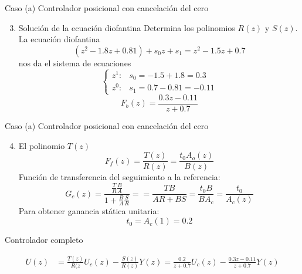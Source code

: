 \documentclass[presentation,aspectratio=169]{beamer}
\begin{document}
\begin{frame}[label={sec:orgd24d4be}]{Caso (a) Controlador posicional con cancelación del cero}
\begin{enumerate}
\setcounter{enumi}{2}
\item \alert{Solución de la ecuación diofantina} Determina los polinomios \(R(z)\) y \(S(z)\). La ecuación diofantina
\[ (z^2 - 1.8z + 0.81) + s_0z + s_1 = z^2 - 1.5z + 0.7 \]
nos da el sistema de ecuaciones
\[ \begin{cases} z^1 :&  s_0 = -1.5+1.8= 0.3\\ z^0:& s_1 = 0.7-0.81=-0.11 \end{cases}\]
\alert{\[F_b(z) = \frac{0.3z - 0.11}{z + 0.7}\]}
\end{enumerate}
\end{frame}
\begin{frame}[label={sec:org56ffd9c}]{Caso (a) Controlador posicional con cancelación del cero}
\begin{enumerate}
\setcounter{enumi}{3}
\item \alert{El polinomio \(T(z)\)}  \[F_f(z) = \frac{T(z)}{R(z)} = \frac{t_0 A_o(z)}{B(z)}\]
Función de transferencia del seguimiento a la referencia:
\[ G_c(z) = \frac{ \frac{T}{R}\frac{B}{A}}{1 + \frac{B}{A} \frac{S}{R}} = 
                  = \frac{TB}{AR+BS} = \frac{t_0B}{BA_c} = \frac{t_0}{A_c(z)}\]
Para obtener ganancia stática unitaria:
  \alert{\[ t_0 = A_c(1) = 0.2 \]}
\end{enumerate}

Controlador completo

\begin{align*}
U(z) &= \frac{T(z)}{R(z}U_c(z) - \frac{S(z)}{R(z)}Y(z) = \frac{0.2}{z+0.7}U_c(z) - \frac{0.3z - 0.11}{z+0.7} Y(z)
     \end{align*}
\end{frame}
\end{document}

